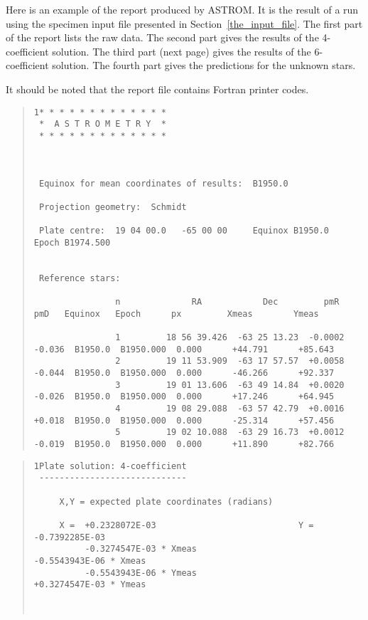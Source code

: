 \documentclass[twoside,11pt]{article}
\renewcommand{\_}{\texttt{\symbol{95}}}
\begin{document}
Here is an example of the report produced by ASTROM.  It is the result
of a run using the specimen input file presented in
Section~\ref{the_input_file}.  The first part of the report lists the
raw data.  The second part gives the results of the 4-coefficient
solution.  The third part (next page) gives the results of the
6-coefficient solution.  The fourth part gives the predictions for the
unknown stars.

It should be noted that the report file contains Fortran printer codes.

\vfill
\begin{tiny}
\begin{quote}
\begin{verbatim}
1* * * * * * * * * * * * *
 *  A S T R O M E T R Y  *
 * * * * * * * * * * * * *



 Equinox for mean coordinates of results:  B1950.0

 Projection geometry:  Schmidt                                 

 Plate centre:  19 04 00.0   -65 00 00     Equinox B1950.0     Epoch B1974.500


 Reference stars:

                n              RA            Dec         pmR    pmD   Equinox   Epoch      px         Xmeas        Ymeas

                1         18 56 39.426  -63 25 13.23  -0.0002 -0.036  B1950.0  B1950.000  0.000      +44.791      +85.643
                2         19 11 53.909  -63 17 57.57  +0.0058 -0.044  B1950.0  B1950.000  0.000      -46.266      +92.337
                3         19 01 13.606  -63 49 14.84  +0.0020 -0.026  B1950.0  B1950.000  0.000      +17.246      +64.945
                4         19 08 29.088  -63 57 42.79  +0.0016 +0.018  B1950.0  B1950.000  0.000      -25.314      +57.456
                5         19 02 10.088  -63 29 16.73  +0.0012 -0.019  B1950.0  B1950.000  0.000      +11.890      +82.766
\end{verbatim}
\end{quote}

\vfill

\begin{quote}
\begin{verbatim}
1Plate solution: 4-coefficient
 -----------------------------

     X,Y = expected plate coordinates (radians)

     X =  +0.2328072E-03                            Y =  -0.7392285E-03
          -0.3274547E-03 * Xmeas                         -0.5543943E-06 * Xmeas
          -0.5543943E-06 * Ymeas                         +0.3274547E-03 * Ymeas



\end{verbatim}
\end{quote}
\end{tiny}
\end{document}

